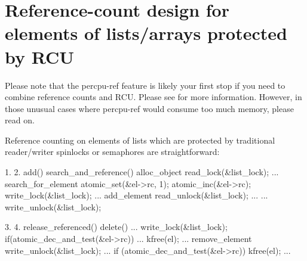 
\section{Reference-count design for elements of lists\//arrays protected by RCU}
\label{sec:rcu:Reference-count design for elements of lists/arrays protected by RCU}

\begin{Note}
  Please note that the percpu-ref feature is likely your first
  stop if you need to combine reference counts and RCU\@.
  Please see
   for more information.
  However, in
  those unusual cases where percpu-ref would consume too much memory,
  please read on.
\end{Note}


Reference counting on elements of lists which are protected by traditional
reader/writer spinlocks or semaphores are straightforward:

\vspace{2ex}
\begin{VerbatimU}[fontsize=\tiny,label={\small{CODE LISTING A}}]
    1.                                      2.
    add()                                   search_and_reference()
    {                                       {
        alloc_object                            read_lock(&list_lock);
        ...                                     search_for_element
        atomic_set(&el->rc, 1);                 atomic_inc(&el->rc);
        write_lock(&list_lock);                 ...
        add_element                             read_unlock(&list_lock);
        ...                                     ...
        write_unlock(&list_lock);           }
    }

    3.                                      4.
    release_referenced()                    delete()
    {                                       {
        ...                                     write_lock(&list_lock);
        if(atomic_dec_and_test(&el->rc))        ...
            kfree(el);
        ...                                     remove_element
    }                                           write_unlock(&list_lock);
                                                ...
                                                if (atomic_dec_and_test(&el->rc))
                                                    kfree(el);
                                                ...
                                            }
\end{VerbatimU}

